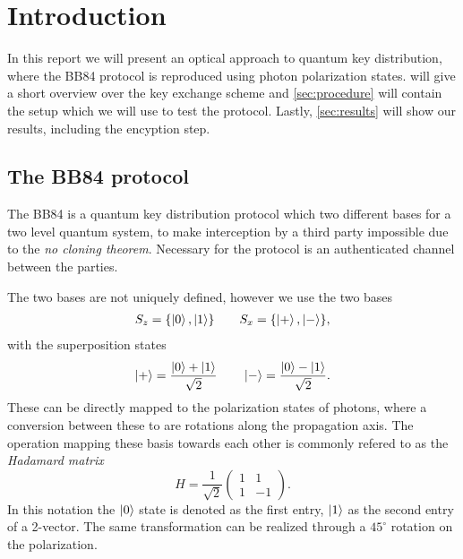 \section{Introduction}
\label{sec:introduction}
In this report we will present an optical approach to quantum key distribution, where the BB84
protocol is reproduced using photon polarization states. \label{sec:BB84} will give a short overview
over the key exchange scheme and \autoref{sec:procedure} will contain the setup which we will use to
test the protocol. Lastly, \autoref{sec:results} will show our results, including the encyption
step.

\subsection{The BB84 protocol}
\label{sec:BB84}
The BB84 is a quantum key distribution protocol which two different bases for a two level quantum
system, to make interception by a third party impossible due to the \textit{no cloning theorem}.
Necessary for the protocol is an authenticated channel between the parties.

The two bases are not uniquely defined, however we use the two bases
\begin{align}
  S_z = \{ \ket{0}, \ket{1} \} \qquad
  S_x = \{ \ket{+}, \ket{-} \},
\end{align}
with the superposition states
\begin{align}
  \ket{+} = \frac{\ket{0} + \ket{1}}{\sqrt{2}} \qquad
  \ket{-} = \frac{\ket{0} - \ket{1}}{\sqrt{2}}.
\end{align}
These can be directly mapped to the polarization states of photons, where a conversion between these
to are rotations along the propagation axis. The operation mapping these basis towards each other is
commonly refered to as the \textit{Hadamard matrix}
\begin{equation}
  H = \frac{1}{\sqrt{2}}
  \begin{pmatrix}
    1 & 1 \\
    1 & -1 
  \end{pmatrix}.
\end{equation}
In this notation the $\ket{0}$ state is denoted as the first entry, $\ket{1}$ as the second entry of
a 2-vector. The same transformation can be realized through a $45^\circ$ rotation on the
polarization.

